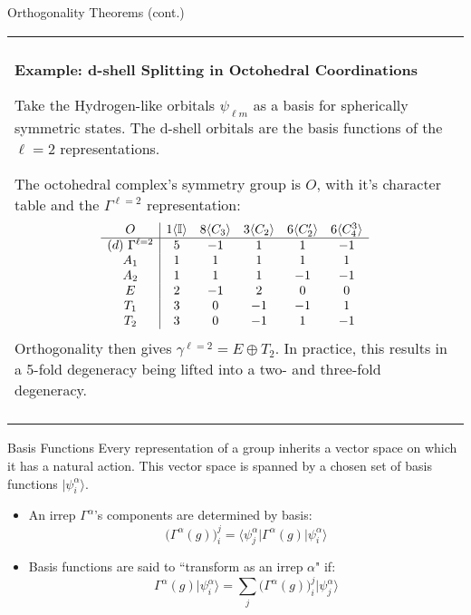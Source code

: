 \documentclass[11pt]{beamer}
\newenvironment{boxed2}
    {\begin{center}
    \begin{tabular}{|p{0.95\textwidth}|}
    \hline\\
    }
    { 
    \\\\\hline
    \end{tabular} 
    \end{center}
    }
\begin{document}
\begin{frame}{Orthogonality Theorems (cont.) }
	\small
\begin{boxed2}
	
	\vspace{-.41cm}
	
	\textbf{Example: d-shell Splitting in Octohedral Coordinations} 
	
	Take the Hydrogen-like orbitals $\psi_{\ell m}$ as a basis for spherically symmetric states. The d-shell orbitals are the basis functions of the $\ell=2$ representations.
	
	\medskip
	
	The octohedral complex's symmetry group is $O$, with it's character table and the $\Gamma^{\ell=2}$ representation:
	$$
	\begin{array}{c|c c c c c}
		O & 1\langle \mathbb{I}\rangle  & 8\langle C_3\rangle  & 3\langle C_2\rangle  & 6\langle C_2'\rangle & 6\langle C_4^3\rangle \\
		\hline 
		(d)\ \Gamma^{\ell=2} & 5 & -1 & 1 & 1 & -1 \\
		A_1 & 1 &  1&  1&  1&  1\\
		A_2 & 1&  1&  1&  -1&  -1\\
		E & 2 & -1 & 2 & 0 & 0 \\
		T_1 & 3 & 0 & -1 & -1 &1\\
		T_2 & 3 & 0 & -1 & 1 &-1\\
	\end{array}
	$$
	Orthogonality then gives $\gamma^{\ell=2}=E\oplus T_2$. In practice, this results in a 5-fold degeneracy being lifted into a two- and three-fold degeneracy.
	
	\vspace{-.3cm}
	
\end{boxed2}
\end{frame}
\begin{frame}{Basis Functions}
	Every representation of a group inherits a vector space on which it has a natural action. This vector space is spanned by a chosen set of basis functions $\vert \psi^{\alpha}_i\rangle$.

	\vspace{0.5cm}
	
	\begin{itemize}
		\item 	An irrep $\Gamma^{\alpha}$'s components are determined by basis:
		$$\Big(\Gamma^{\alpha}(g)\Big)_{i}^{j}=\langle\psi^{\alpha}_j\vert \Gamma^{\alpha}(g) \vert \psi^{\alpha}_i\rangle$$
		
		\item Basis functions are said to ``transform as an irrep $\alpha$" if:
		$$
		\Gamma^{\alpha}(g) \vert \psi^{\alpha}_i\rangle =\sum_{j} \Big(\Gamma^{\alpha}(g)\Big)^j_i \vert \psi^{\alpha}_j\rangle
		$$
	\end{itemize}
	

\end{frame}
\end{document}
